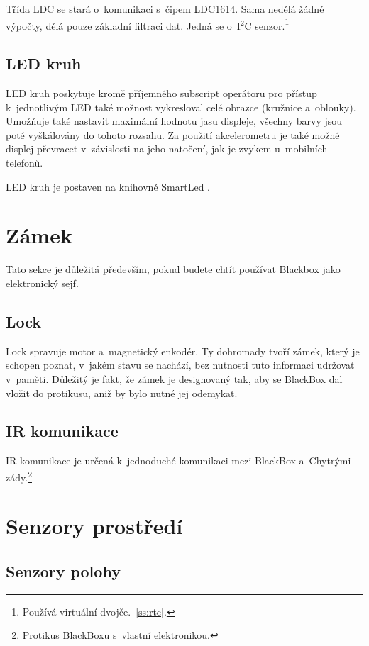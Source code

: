 Třída LDC se stará o~komunikaci s~čipem LDC1614.
Sama nedělá žádné výpočty, dělá pouze základní filtraci dat.
Jedná se o~I$^2$C senzor.\footnote{Používá virtuální dvojče.~\autoref{ss:rtc}.}

\subsection{LED kruh}

LED kruh poskytuje kromě příjemného subscript operátoru pro přístup k~jednotlivým LED také možnost vykresloval celé obrazce (kružnice a~oblouky).
Umožňuje také nastavit maximální hodnotu jasu displeje, všechny barvy jsou poté vyškálovány do tohoto rozsahu.
Za použití akcelerometru je také možné displej převracet v~závislosti na jeho natočení, jak je zvykem u~mobilních telefonů.

LED kruh je postaven na knihovně SmartLed \cite{SmartLeds}.

\section{Zámek}

Tato sekce je důležitá především, pokud budete chtít používat Blackbox jako elektronický sejf.

\subsection{Lock}

Lock spravuje motor a~magnetický enkodér.
Ty dohromady tvoří zámek, který je schopen poznat, v~jakém stavu se nachází, bez nutnosti tuto informaci udržovat v~paměti.
Důležitý je fakt, že zámek je designovaný tak, aby se BlackBox dal vložit do protikusu, aniž by bylo nutné jej odemykat.

\subsection{IR komunikace}

IR komunikace je určená k~jednoduché komunikaci mezi BlackBox a~Chytrými zády.\footnote{Protikus BlackBoxu s~vlastní elektronikou.}


\section{Senzory prostředí}

\subsection{Senzory polohy}

